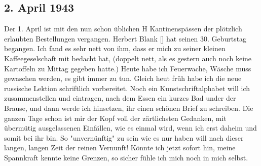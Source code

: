 \subsection{2. April 1943}

Der 1. April ist mit den nun schon \"{u}blichen H Kantinensp\"{a}ssen der pl\"{o}tzlich erlaubten Bestellungen vergangen.
Herbert Blank {\color{red} [] } hat seinen 30. Geburtstag begangen.
Ich fand es sehr nett von ihm, dass er mich zu seiner kleinen Kaffeegeselschaft mit bedacht hat, (doppelt nett, als es gestern auch noch keine Kartoffeln zu Mittag gegeben hatte.)
Heute habe ich Feuerwache, W\"{a}sche muss gewaschen werden, es gibt immer zu tun.
Gleich heut fr\"{u}h habe ich die neue russische Lektion schriftlich vorbereitet.
Noch ein Kunstschriftalphabet will ich zusammenstellen und eintragen, nach dem Essen ein kurzes Bad under der Brause, und dann werde ich hinsetzen, ihr einen sch\"{o}nen Brief zu schreiben.
Die ganzen Tage schon ist mir der Kopf voll der z\"{a}rtlichsten Gedanken, mit \"{u}berm\"{u}tig ausgelassenen Einf\"{a}llen, wie es einmal wird, wenn ich erst daheim und somit bei ihr bin.
So "unvern\"{u}nftig" zu sein wie es nur haben will nach dieser langen, langen Zeit der reinen Vernunft!
K\"{o}nnte ich jetzt sofort hin, meine Spannkraft kennte keine Grenzen, so sicher f\"{u}hle ich mich noch in mich selbst.

\clearpage
